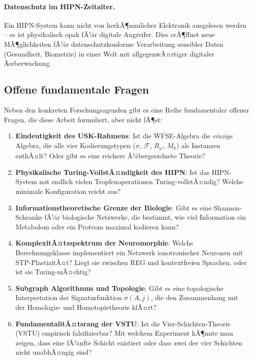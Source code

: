 ﻿\documentclass[a4paper,12pt]{scrreprt}
\theoremstyle{definition}
\begin{document}
\paragraph{Datenschutz im HIPN-Zeitalter.}
Ein HIPN-System kann nicht von herkÃ¶mmlicher Elektronik ausgelesen
werden -- es ist physikalisch opak fÃ¼r digitale Angreifer. Dies
erÃ¶ffnet neue MÃ¶glichkeiten fÃ¼r datenschutzkonforme Verarbeitung
sensibler Daten (Gesundheit, Biometrie) in einer Welt mit
allgegenwÃ¤rtiger digitaler Ãœberwachung.

\subsection{Offene fundamentale Fragen}

Neben den konkreten Forschungsagenden gibt es eine Reihe
fundamentaler offener Fragen, die diese Arbeit formuliert, aber nicht
lÃ¶st:

\begin{enumerate}
  \item \textbf{Eindeutigkeit des USK-Rahmens}: Ist die WFSE-Algebra
    die \emph{einzige} Algebra, die alle vier Kodierungstypen
    ($\sigma$, $\mathcal{F}$, $R_\varphi$, $M_k$) als Instanzen
    enthÃ¤lt? Oder gibt es eine reichere Ã¼bergeordnete Theorie?
  \item \textbf{Physikalische Turing-VollstÃ¤ndigkeit des HIPN}:
    Ist das HIPN-System mit endlich vielen Tropfenoperationen
    Turing-vollstÃ¤ndig? Welche minimale Konfiguration reicht aus?
  \item \textbf{Informationstheoretische Grenze der Biologie}:
    Gibt es eine Shannon-Schranke fÃ¼r biologische Netzwerke,
    die bestimmt, wie viel Information ein Metabolom oder ein
    Proteom maximal kodieren kann?
  \item \textbf{KomplexitÃ¤tsspektrum der Neuromorphie}:
    Welche Berechnungsklasse implementiert ein Netzwerk ionotronischer
    Neuronen mit STP-PlastizitÃ¤t? Liegt sie zwischen REG und
    kontextfreien Sprachen, oder ist sie Turing-mÃ¤chtig?
  \item \textbf{Subgraph Algorithmus und Topologie}:
    Gibt es eine topologische Interpretation der Signaturfunktion
    $\sigma(A,j)$, die den Zusammenhang mit der Homologie- und
    Homotopietheorie klÃ¤rt?
  \item \textbf{FundamentalitÃ¤tsrang der VSTU}:
    Ist die Vier-Schichten-Theorie (VSTU) empirisch falsifizierbar?
    Mit welchem Experiment kÃ¶nnte man zeigen, dass eine fÃ¼nfte
    Schicht existiert oder dass zwei der vier Schichten nicht
    unabhÃ¤ngig sind?
\end{enumerate}
\end{document}
